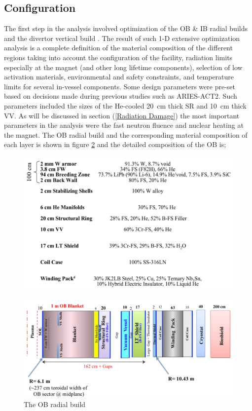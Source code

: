 \documentclass[12pt, letterpaper]{elsarticle}
\begin{document}
\subsection{Configuration} \label{Configuration}
The first step in the analysis involved optimization of the OB \& IB radial builds and the divertor vertical build \cite{ref_2}. The result of such 1-D extensive optimization analysis is a complete definition of the material composition of the different regions taking into account the configuration of the facility, radiation limits especially at the magnet (and other long lifetime components), selection of low activation materials, environmental and safety constraints, and temperature limits for several in-vessel components. Some design parameters were pre-set based on decisions made during previous studies such as ARIES-ACT2. Such parameters included the sizes of the He-cooled \SI{20}{cm} thick SR and \SI{10}{cm} thick VV. As will be discussed in section (\ref{Radiation Damage}) the most important parameters in the analysis were the fast neutron fluence and nuclear heating at the magnet. The OB radial build and the corresponding material composition of each layer is shown in figure \ref{fig:OB_radial} and the detailed composition of the OB is;
\begin{figure}[h!]
  \centering
  \includegraphics[scale=0.2]{../plots/OB_comp.png}
  \label{fig:OB_comp}
\end{figure}
\begin{figure}[h!]
  \centering
  \includegraphics[scale=0.2]{../plots/OB_radial.png}
  \caption{The OB radial build}
  \label{fig:OB_radial}
\end{figure}
\end{document}
